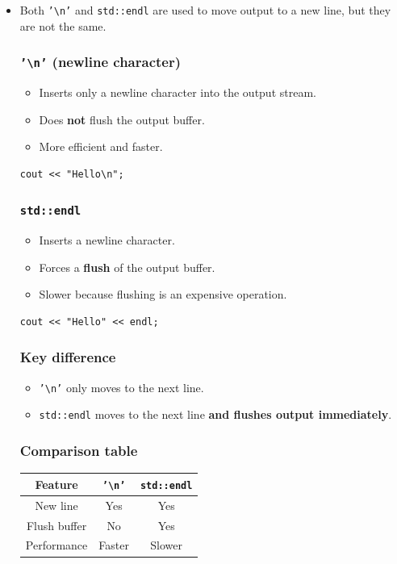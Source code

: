 \documentclass[10pt]{article}
\begin{document}
\begin{itemize}
	\item Both \texttt{'\textbackslash n'} and \texttt{std::endl} are used to move output to a new line, but they are not the same.

	\subsubsection*{\texttt{'\textbackslash n'} (newline character)}
	\begin{itemize}
		\item Inserts only a newline character into the output stream.
		\item Does \textbf{not} flush the output buffer.
		\item More efficient and faster.
	\end{itemize}

	\begin{verbatim}
cout << "Hello\n";
	\end{verbatim}

	\subsubsection*{\texttt{std::endl}}
	\begin{itemize}
		\item Inserts a newline character.
		\item Forces a \textbf{flush} of the output buffer.
		\item Slower because flushing is an expensive operation.
	\end{itemize}

	\begin{verbatim}
cout << "Hello" << endl;
	\end{verbatim}

	\subsubsection*{Key difference}
	\begin{itemize}
		\item \texttt{'\textbackslash n'} only moves to the next line.
		\item \texttt{std::endl} moves to the next line \textbf{and flushes output immediately}.
	\end{itemize}

	\subsubsection*{Comparison table}
	\begin{center}
	\begin{tabular}{|c|c|c|}
	\hline
	Feature & \texttt{'\textbackslash n'} & \texttt{std::endl} \\
	\hline
	New line & Yes & Yes \\
	Flush buffer & No & Yes \\
	Performance & Faster & Slower \\
	\hline
	\end{tabular}
	\end{center}


\end{itemize}
\end{document}
